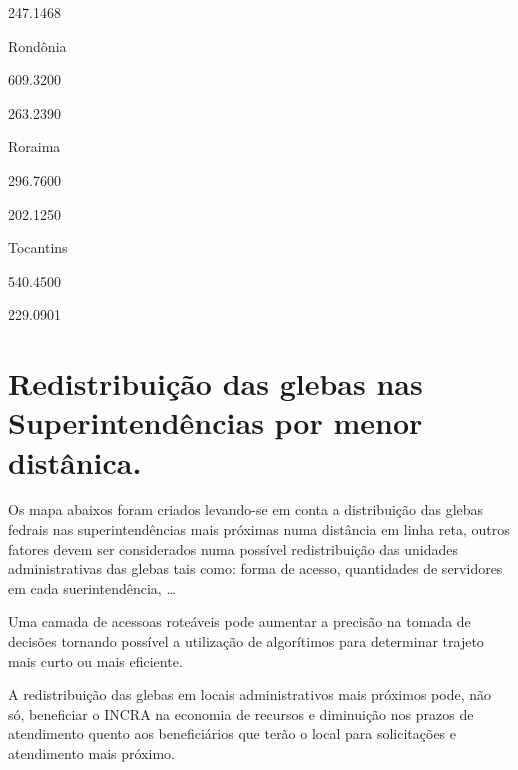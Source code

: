 \documentclass[
  letterpaper,
]{report}
\begin{document}
247.1468

\n    

\n    

\n      

Rondônia

\n      

609.3200

\n      

263.2390

\n    

\n    

\n      

Roraima

\n      

296.7600

\n      

202.1250

\n    

\n    

\n      

Tocantins

\n      

540.4500

\n      

229.0901

\n    

\n  

\n

\hypertarget{redistribuiuxe7uxe3o-das-glebas-nas-superintenduxeancias-por-menor-distuxe2nica.}{%
\section{Redistribuição das glebas nas Superintendências por menor
distânica.}\label{redistribuiuxe7uxe3o-das-glebas-nas-superintenduxeancias-por-menor-distuxe2nica.}}

Os mapa abaixos foram criados levando-se em conta a distribuição das
glebas fedrais nas superintendências mais próximas numa distância em
linha reta, outros fatores devem ser considerados numa possível
redistribuição das unidades administrativas das glebas tais como: forma
de acesso, quantidades de servidores em cada suerintendência, \ldots{}

Uma camada de acessoas roteáveis pode aumentar a precisão na tomada de
decisões tornando possível a utilização de algorítimos para determinar
trajeto mais curto ou mais eficiente.

A redistribuição das glebas em locais administrativos mais próximos
pode, não só, beneficiar o INCRA na economia de recursos e diminuição
nos prazos de atendimento quento aos beneficiários que terão o local
para solicitações e atendimento mais próximo.
\end{document}
